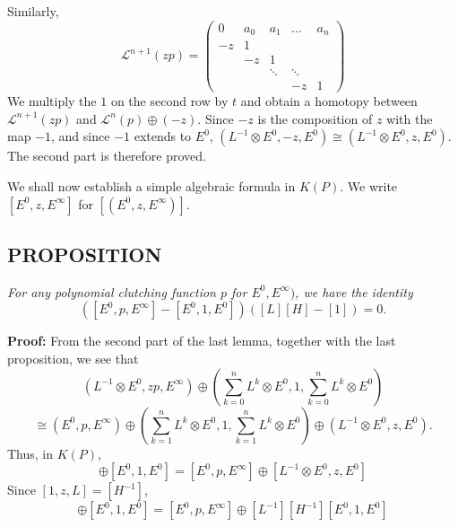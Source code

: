 Similarly,
\begin{equation*}
    \mathcal{L}^{n+1}(zp) =
    \begin{pmatrix}
        0   & a_0 & a_1 & \ldots & a_n \\
        -z  &  1  &     &        &     \\
            & -z  &  1  &        &     \\
            &     &\ddots& \ddots&     \\
            &     &     &   -z   &  1
    \end{pmatrix}
\end{equation*}
We multiply the $1$ on the second row by $t$ and obtain a homotopy between $\mathcal{L}^{n+1}(zp)$ and $\mathcal{L}^n(p) \oplus (-z)$. Since $-z$ is the composition of $z$ with the map $-1$, and since $-1$ extends to $E^0$, $(L^{-1} \otimes E^0, -z, E^0) \cong (L^{-1} \otimes E^0, z, E^0)$. The second part is therefore proved. \par 

We shall now establish a simple algebraic formula in $K(P)$. We write $[E^0, z, E^\infty]$ for $[(E^0, z, E^\infty)]$.

\subsection{PROPOSITION}\label{pro:2.2.7} \textit{For any polynomial clutching function $p$ for $E^0, E^\infty)$, we have the identity}
\begin{equation*}
    ([E^0, p, E^\infty] - [E^0, 1, E^0])([L][H] - [1]) = 0.
\end{equation*} \par 

\textbf{Proof:} From the second part of the last lemma, together with the last proposition, we see that
\begin{equation*}
    (L^{-1} \otimes E^0, zp, E^\infty) \oplus \left( \sum_{k = 0}^n L^k \otimes E^0, 1, \sum_{k = 0}^n L^k \otimes E^0  \right)
\end{equation*}
\begin{equation*}
    \cong (E^0, p, E^\infty) \oplus \left( \sum_{k = 1}^n L^k \otimes E^0, 1, \sum_{k = 1}^n L^k \otimes E^0  \right) \oplus (L^{-1} \otimes E^0, z, E^0) .
\end{equation*}
Thus, in $K(P)$,
\begin{equation*}
    [L^{-1} \otimes E^0, zp, E^\infty] \oplus [E^0, 1, E^0] = [E^0, p, E^\infty] \oplus [L^{-1} \otimes E^0, z, E^0]
\end{equation*}
Since $[1, z, L] = [H^{-1}]$,
\begin{equation*}
    [L^{-1}][H^{-1}][E^0, p, E^\infty] \oplus [E^0, 1, E^0] = [E^0, p, E^\infty] \oplus [L^{-1}][H^{-1}][E^0, 1, E^0]
\end{equation*} \par 

